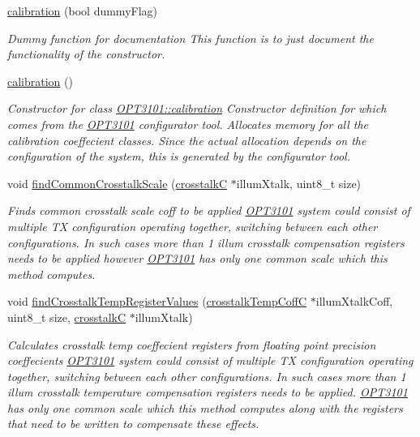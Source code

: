 \begin{DoxyCompactItemize}
\item 
\mbox{\hyperlink{class_o_p_t3101_1_1calibration_a152dc93111d392a23fdc53a0c739eb48}{calibration}} (bool dummy\+Flag)
\begin{DoxyCompactList}\small\item\em Dummy function for documentation This function is to just document the functionality of the constructor. \end{DoxyCompactList}\item 
\mbox{\hyperlink{class_o_p_t3101_1_1calibration_a0d17887ea1f493ce825311164f6791dc}{calibration}} ()
\begin{DoxyCompactList}\small\item\em Constructor for class \mbox{\hyperlink{class_o_p_t3101_1_1calibration}{O\+P\+T3101\+::calibration}} Constructor definition for which comes from the \mbox{\hyperlink{namespace_o_p_t3101}{O\+P\+T3101}} configurator tool. Allocates memory for all the calibration coeffecient classes. Since the actual allocation depends on the configuration of the system, this is generated by the configurator tool. \end{DoxyCompactList}\item 
void \mbox{\hyperlink{class_o_p_t3101_1_1calibration_a68e5beea82c3c36560049a6da50e0838}{find\+Common\+Crosstalk\+Scale}} (\mbox{\hyperlink{class_o_p_t3101_1_1crosstalk_c}{crosstalkC}} $\ast$illum\+Xtalk, uint8\+\_\+t size)
\begin{DoxyCompactList}\small\item\em Finds common crosstalk scale coff to be applied \mbox{\hyperlink{namespace_o_p_t3101}{O\+P\+T3101}} system could consist of multiple TX configuration operating together, switching between each other configurations. In such cases more than 1 illum crosstalk compensation registers needs to be applied however \mbox{\hyperlink{namespace_o_p_t3101}{O\+P\+T3101}} has only one common scale which this method computes. \end{DoxyCompactList}\item 
void \mbox{\hyperlink{class_o_p_t3101_1_1calibration_a33cdd65949df522556ff00bbf77dac29}{find\+Crosstalk\+Temp\+Register\+Values}} (\mbox{\hyperlink{class_o_p_t3101_1_1crosstalk_temp_coff_c}{crosstalk\+Temp\+CoffC}} $\ast$illum\+Xtalk\+Coff, uint8\+\_\+t size, \mbox{\hyperlink{class_o_p_t3101_1_1crosstalk_c}{crosstalkC}} $\ast$illum\+Xtalk)
\begin{DoxyCompactList}\small\item\em Calculates crosstalk temp coeffecient registers from floating point precision coeffecients \mbox{\hyperlink{namespace_o_p_t3101}{O\+P\+T3101}} system could consist of multiple TX configuration operating together, switching between each other configurations. In such cases more than 1 illum crosstalk temperature compensation registers needs to be applied. \mbox{\hyperlink{namespace_o_p_t3101}{O\+P\+T3101}} has only one common scale which this method computes along with the registers that need to be written to compensate these effects. \end{DoxyCompactList}\item 

\end{DoxyCompactItemize}
